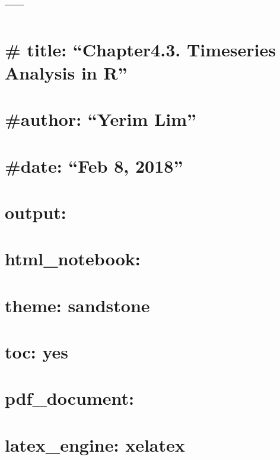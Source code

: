 \documentclass[]{article}
\title{}
\author{}
\date{}
\begin{document}
\section{---}\label{section}

\section{\texorpdfstring{\# title: ``Chapter4.3. Timeseries Analysis in
R''}{\# title: Chapter4.3. Timeseries Analysis in R}}\label{title-chapter4.3.-timeseries-analysis-in-r}

\section{\texorpdfstring{\#author: ``Yerim
Lim''}{\#author: Yerim Lim}}\label{author-yerim-lim}

\section{\texorpdfstring{\#date: ``Feb 8,
2018''}{\#date: Feb 8, 2018}}\label{date-feb-8-2018}

\section{output:}\label{output}

\section{html\_notebook:}\label{html_notebook}

\section{theme: sandstone}\label{theme-sandstone}

\section{toc: yes}\label{toc-yes}

\section{pdf\_document:}\label{pdf_document}

\section{latex\_engine: xelatex}\label{latex_engine-xelatex}
\end{document}
